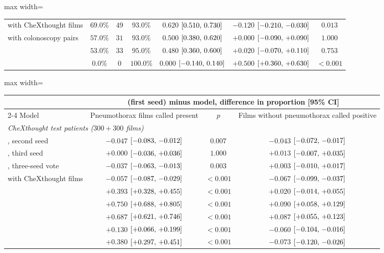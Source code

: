 \begin{table}[!htbp]
\begin{adjustbox}{max width=\linewidth}
\begin{tabular}{l ccc c cc}
\msp{} with CheXthought films & $69.0\%$ & $49$ & $93.0\%$ & $0.620$ $[0.510,\,0.730]$ & $-0.120$ $[-0.210,\,-0.030]$ & $0.013$ \\
\msp{} with colonoscopy pairs & $57.0\%$ & $31$ & $93.0\%$ & $0.500$ $[0.380,\,0.620]$ & $+0.000$ $[-0.090,\,+0.090]$ & $1.000$ \\
\msp{} & $53.0\%$ & $33$ & $95.0\%$ & $0.480$ $[0.360,\,0.600]$ & $+0.020$ $[-0.070,\,+0.110]$ & $0.753$ \\
\ms{} & $0.0\%$ & $0$ & $100.0\%$ & $0.000$ $[-0.140,\,0.140]$ & $+0.500$ $[+0.360,\,+0.630]$ & $<0.001$ \\
\bottomrule
\end{tabular}
\end{adjustbox}

\vspace{0.6em}
\begin{adjustbox}{max width=\linewidth}
\begin{tabular}{l cc c}
\toprule
 & \multicolumn{3}{c}{\msn{} (first seed) minus model, difference in proportion [95\% CI]} \\
\cmidrule(lr){2-4}
Model & Pneumothorax films called present & $p$ & Films without pneumothorax called positive \\
\midrule
\multicolumn{4}{l}{\emph{CheXthought test patients ($300 + 300$ films)}} \\
\msn{}, second seed & $-0.047$ $[-0.083,\,-0.012]$ & $0.007$ & $-0.043$ $[-0.072,\,-0.017]$ \\
\msn{}, third seed & $+0.000$ $[-0.036,\,+0.036]$ & $1.000$ & $+0.013$ $[-0.007,\,+0.035]$ \\
\msn{}, three-seed vote & $-0.037$ $[-0.063,\,-0.013]$ & $0.003$ & $+0.003$ $[-0.010,\,+0.017]$ \\
\msp{} with CheXthought films & $-0.057$ $[-0.087,\,-0.029]$ & $<0.001$ & $-0.067$ $[-0.099,\,-0.037]$ \\
\msp{} & $+0.393$ $[+0.328,\,+0.455]$ & $<0.001$ & $+0.020$ $[-0.014,\,+0.055]$ \\
\ms{} & $+0.750$ $[+0.688,\,+0.805]$ & $<0.001$ & $+0.090$ $[+0.058,\,+0.129]$ \\
\base{} & $+0.687$ $[+0.621,\,+0.746]$ & $<0.001$ & $+0.087$ $[+0.055,\,+0.123]$ \\
\gem{} & $+0.130$ $[+0.066,\,+0.199]$ & $<0.001$ & $-0.060$ $[-0.104,\,-0.016]$ \\
\opus{} & $+0.380$ $[+0.297,\,+0.451]$ & $<0.001$ & $-0.073$ $[-0.120,\,-0.026]$ \\

\end{tabular}
\end{adjustbox}
\end{table}
